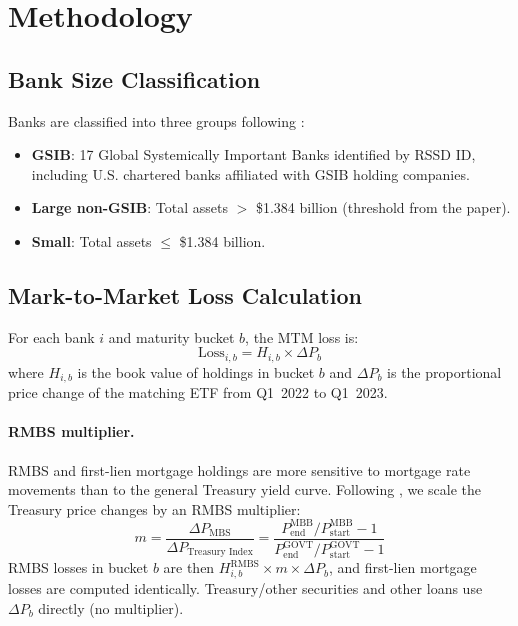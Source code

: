 \documentclass[12pt]{article}
\begin{document}
\section{Methodology}\label{sec:method}

\subsection{Bank Size Classification}

Banks are classified into three groups following \citet{jiang2024monetary}:
\begin{itemize}
  \item \textbf{GSIB}: 17 Global Systemically Important Banks identified by
        RSSD ID, including U.S. chartered banks affiliated with GSIB
        holding companies.
  \item \textbf{Large non-GSIB}: Total assets $>$ \$1.384 billion (threshold
        from the paper).
  \item \textbf{Small}: Total assets $\leq$ \$1.384 billion.
\end{itemize}

\subsection{Mark-to-Market Loss Calculation}

For each bank $i$ and maturity bucket $b$, the MTM loss is:
\begin{equation}
  \text{Loss}_{i,b} = H_{i,b} \times \Delta P_b
\end{equation}
where $H_{i,b}$ is the book value of holdings in bucket $b$ and $\Delta P_b$
is the proportional price change of the matching ETF from Q1~2022 to
Q1~2023.

\paragraph{RMBS multiplier.}
RMBS and first-lien mortgage holdings are more sensitive to mortgage rate
movements than to the general Treasury yield curve.  Following
\citet{jiang2024monetary}, we scale the Treasury price changes by an
RMBS multiplier:
\begin{equation}
  m = \frac{\Delta P_{\text{MBS}}}{\Delta P_{\text{Treasury Index}}}
    = \frac{P^{\text{MBB}}_{\text{end}}/P^{\text{MBB}}_{\text{start}} - 1}%
           {P^{\text{GOVT}}_{\text{end}}/P^{\text{GOVT}}_{\text{start}} - 1}
\end{equation}
RMBS losses in bucket $b$ are then $H_{i,b}^{\text{RMBS}} \times m \times
\Delta P_b$, and first-lien mortgage losses are computed identically.
Treasury/other securities and other loans use $\Delta P_b$ directly (no
multiplier).
\end{document}
